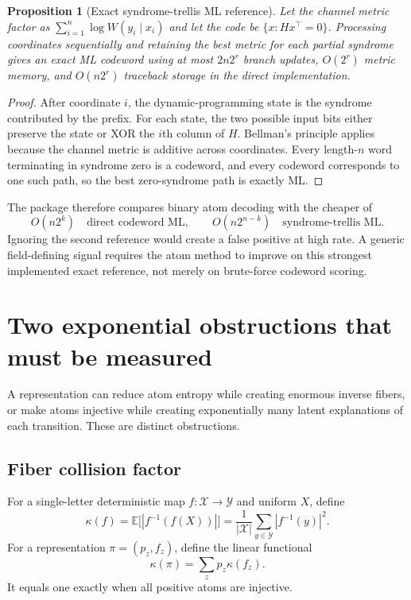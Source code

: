 \documentclass[11pt]{article}
\newtheorem{proposition}[theorem]{Proposition}
\theoremstyle{definition}
\theoremstyle{remark}
\newcommand{\X}{\mathcal X}
\newcommand{\Y}{\mathcal Y}
\newcommand{\E}{\mathbb E}
\begin{document}
\begin{proposition}[Exact syndrome-trellis ML reference]
Let the channel metric factor as $\sum_{i=1}^n \log W(y_i\mid x_i)$ and let the code be $\{x:Hx^\top=0\}$. Processing coordinates sequentially and retaining the best metric for each partial syndrome gives an exact ML codeword using at most $2n2^r$ branch updates, $O(2^r)$ metric memory, and $O(n2^r)$ traceback storage in the direct implementation.
\end{proposition}

\begin{proof}
After coordinate $i$, the dynamic-programming state is the syndrome contributed by the prefix. For each state, the two possible input bits either preserve the state or XOR the $i$th column of $H$. Bellman's principle applies because the channel metric is additive across coordinates. Every length-$n$ word terminating in syndrome zero is a codeword, and every codeword corresponds to one such path, so the best zero-syndrome path is exactly ML.
\end{proof}

The package therefore compares binary atom decoding with the cheaper of
\begin{equation}
  O(n2^k) \quad\text{direct codeword ML},\qquad
  O(n2^{n-k}) \quad\text{syndrome-trellis ML}.
\end{equation}
Ignoring the second reference would create a false positive at high rate. A generic field-defining signal requires the atom method to improve on this strongest implemented exact reference, not merely on brute-force codeword scoring.

\section{Two exponential obstructions that must be measured}

A representation can reduce atom entropy while creating enormous inverse fibers, or make atoms injective while creating exponentially many latent explanations of each transition. These are distinct obstructions.

\subsection{Fiber collision factor}

For a single-letter deterministic map $f:\X\to\Y$ and uniform $X$, define
\begin{equation}
 \kappa(f)=\E\big[|f^{-1}(f(X))|\big]
 =\frac1{|\X|}\sum_{y\in\Y}|f^{-1}(y)|^2.
 \label{eq:kappaf}
\end{equation}
For a representation $\pi=(p_z,f_z)$, define the linear functional
\begin{equation}
 \kappa(\pi)=\sum_zp_z\kappa(f_z).
 \label{eq:kappapi}
\end{equation}
It equals one exactly when all positive atoms are injective.
\end{document}
